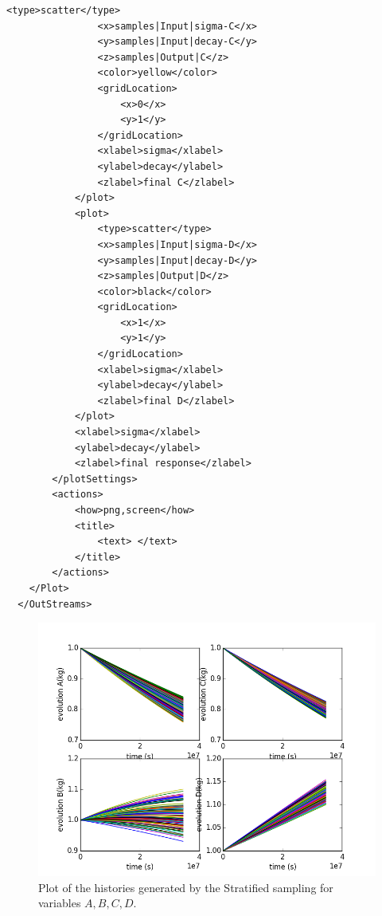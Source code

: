 \begin{enumerate}
\begin{lstlisting}[style=XML,morekeywords={arg,extension,pauseAtEnd,overwrite}]
                <type>scatter</type>
                <x>samples|Input|sigma-C</x>
                <y>samples|Input|decay-C</y>
                <z>samples|Output|C</z>
                <color>yellow</color>
                <gridLocation>
                    <x>0</x>
                    <y>1</y>
                </gridLocation>
                <xlabel>sigma</xlabel>
                <ylabel>decay</ylabel>
                <zlabel>final C</zlabel>
            </plot>
            <plot>
                <type>scatter</type>
                <x>samples|Input|sigma-D</x>
                <y>samples|Input|decay-D</y>
                <z>samples|Output|D</z>
                <color>black</color>
                <gridLocation>
                    <x>1</x>
                    <y>1</y>
                </gridLocation>
                <xlabel>sigma</xlabel>
                <ylabel>decay</ylabel>
                <zlabel>final D</zlabel>
            </plot>
            <xlabel>sigma</xlabel>
            <ylabel>decay</ylabel>
            <zlabel>final response</zlabel>
        </plotSettings>
        <actions>
            <how>png,screen</how>
            <title>
                <text> </text>
            </title>
        </actions>
    </Plot>
  </OutStreams>
\end{lstlisting}
 \begin{figure}[h!]
  \centering
  \includegraphics[scale=0.7]{pics/Stratified_histories.png}
  \caption{Plot of the histories generated by the Stratified sampling for variables $A,B,C,D$.}
  \label{fig:historiesStratifiedPlotLine}
 \end{figure}

\end{enumerate}
